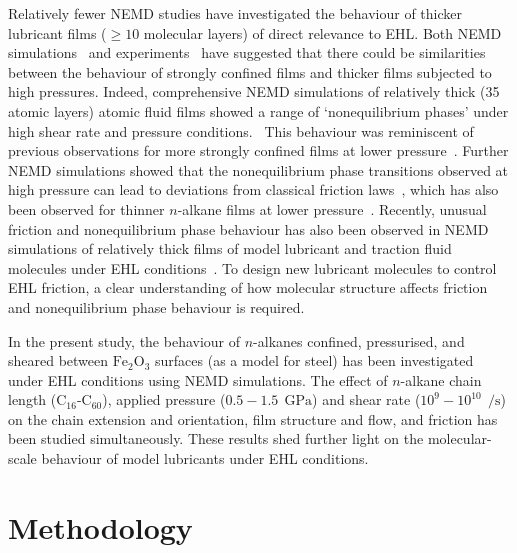 \documentclass[5p]{elsarticle}
\begin{document}
Relatively fewer NEMD studies have investigated the behaviour of thicker lubricant films ($\geq 10$ molecular layers) of direct relevance to EHL. Both NEMD simulations~\cite{Thompson1992,Robbins1996} and experiments~\cite{VanAlsten1988} have suggested that there could be similarities between the behaviour of strongly confined films and thicker films subjected to high pressures. Indeed, comprehensive NEMD simulations of relatively thick (35 atomic layers) atomic fluid films showed a range of `nonequilibrium phases' under high shear rate and pressure conditions.~\cite{Heyes2012,Gattinoni2013} This behaviour was reminiscent of previous observations for more strongly confined films at lower pressure~\cite{Thompson1990}. Further NEMD simulations showed that the nonequilibrium phase transitions observed at high pressure can lead to deviations from classical friction laws~\cite{Mackowiak2016}, which has also been observed for thinner $n$-alkane films at lower pressure~\cite{Sivebaek2010}. Recently, unusual friction and nonequilibrium phase behaviour has also been observed in NEMD simulations of relatively thick films of model lubricant and traction fluid molecules under EHL conditions~\cite{Ewen2017a}. To design new lubricant molecules to control EHL friction, a clear understanding of how molecular structure affects friction and nonequilibrium phase behaviour is required.

In the present study, the behaviour of $n$-alkanes confined, pressurised, and sheared between $\text{Fe}_2\text{O}_3$ surfaces (as a model for steel) has been investigated under EHL conditions using NEMD simulations. The effect of $n$-alkane chain length (C$_{16}$-C$_{60}$), applied pressure ($0.5 - 1.5~\SI{}{\giga\pascal}$) and shear rate ($10^{9} - 10^{10} ~\SI{}{\per\second}$) on the chain extension and orientation, film structure and flow, and friction has been studied simultaneously. These results shed further light on the molecular-scale behaviour of model lubricants under EHL conditions.


\section{Methodology}
\label{method}
\end{document}
